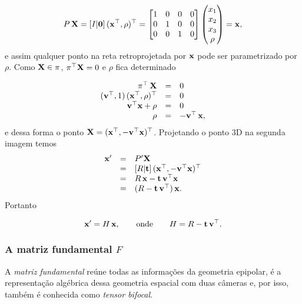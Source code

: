 \begin{equation*}
P\,\mathbf{X}=
[I|{\bf 0}]\,(\mathbf{x}^\top,\rho)^\top=
\begin{bmatrix}
1&0&0&0\\
0&1&0&0\\
0&0&1&0
\end{bmatrix}
\begin{pmatrix}
x_1\\
x_2\\
x_3\\
\rho
\end{pmatrix}
=\mathbf{x},
\end{equation*}
e assim qualquer ponto na reta retroprojetada por $\mathbf{x}$ pode ser parametrizado por $\rho$. Como $\mathbf{X}\in\pi$, $\pi^\top\mathbf{X}=0$ e  
$\rho$ fica determinado

\begin{equation*}
\begin{array}{rcl}
\pi^\top\,\mathbf{X}&=&0\\
({\bf v}^\top,1)\,(\mathbf{x}^\top,\rho)^\top&=&0\\
{\bf v}^\top\mathbf{x}+\rho&=&0\\
\rho&=&-{\bf v}^\top\,\mathbf{x},
\end{array}
\end{equation*}
e dessa forma o ponto $\mathbf{X}=(\mathbf{x}^\top,-{\bf v}^\top\mathbf{x})^\top$.
Projetando o ponto 3D na segunda imagem temos
\begin{equation*}
\begin{array}{rcl}
\mathbf{x}'&=&P'\mathbf{X}\\
&=&[R|{\bf t}]\,(\mathbf{x}^\top,-{\bf v}^\top\mathbf{x})^\top\\
&=&R\,\mathbf{x}-{\bf t}\,{\bf v}^\top\mathbf{x}\\
&=&(R-{\bf t}\,{\bf v}^\top)\,\mathbf{x}.
\end{array}
\end{equation*}
Portanto

\begin{equation*}
\mathbf{x}'=H\,\mathbf{x},\qquad\text{onde}\qquad H=R-{\bf t}\,{\bf v}^\top.
\end{equation*}


\subsubsection{A matriz fundamental $F$}\label{sec.matriz-F}

A \textit{matriz fundamental} reúne todas as informações da geometria epipolar, é a representação algébrica dessa geometria espacial com duas câmeras e, por isso, também é conhecida como \textit{tensor bifocal}. 

